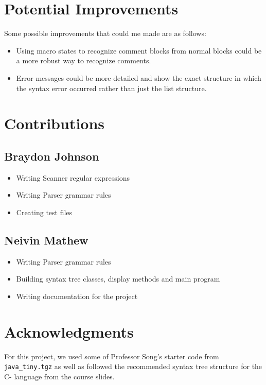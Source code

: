 \documentclass[12pt,letterpaper]{article}
\begin{document}
\section{Potential Improvements}
Some possible improvements that could me made are as follows:
\begin{itemize}[leftmargin=12pt]
\setlength\itemsep{0em}
\item Using macro states to recognize comment blocks from normal blocks could be a more robust way to recognize comments.
\item Error messages could be more detailed and show the exact structure in which the syntax error occurred rather than just the list structure.

\end{itemize}

\section{Contributions}
\subsection{Braydon Johnson}
\begin{itemize}[leftmargin=12pt]
\setlength\itemsep{0em}
\item Writing Scanner regular expressions
\item Writing Parser grammar rules
\item Creating test files
\end{itemize}

\subsection{Neivin Mathew}
\begin{itemize}[leftmargin=12pt]
\setlength\itemsep{0em}
\item Writing Parser grammar rules
\item Building syntax tree classes, display methods and main program
\item Writing documentation for the project
\end{itemize}

\section{Acknowledgments}
For this project, we used some of Professor Song's starter code from \texttt{java\_tiny.tgz} as well as followed the recommended syntax tree structure for the C- language from the course slides.
\end{document}
